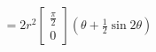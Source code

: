\documentclass[preview]{standalone}
\begin{document}
\begin{align*}
= 2r^{2} \left[ \substack{\frac{\pi}{2} \\ 0} \right] \left(\theta + \frac{1}{2}\sin2\theta \right)
\end{align*}
\end{document}
